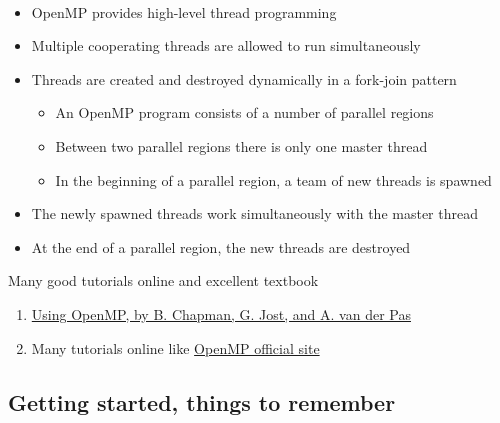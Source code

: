\documentclass[%
oneside,                 %
final,                   %
10pt]{article}
\begin{document}
\paragraph{}
\begin{itemize}
\item OpenMP provides high-level thread programming

\item Multiple cooperating threads are allowed to run simultaneously

\item Threads are created and destroyed dynamically in a fork-join pattern
\begin{itemize}

   \item An OpenMP program consists of a number of parallel regions

   \item Between two parallel regions there is only one master thread

   \item In the beginning of a parallel region, a team of new threads is spawned

\end{itemize}

\noindent
  \item The newly spawned threads work simultaneously with the master thread

  \item At the end of a parallel region, the new threads are destroyed
\end{itemize}

\noindent
Many good tutorials online and excellent textbook
\begin{enumerate}
\item \href{{http://mitpress.mit.edu/books/using-openmp}}{Using OpenMP, by B. Chapman, G. Jost, and A. van der Pas}

\item Many tutorials online like \href{{http://www.openmp.org}}{OpenMP official site}
\end{enumerate}

\noindent



\subsection{Getting started, things to remember}

\end{document}
